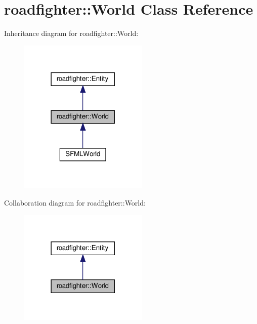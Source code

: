 \hypertarget{classroadfighter_1_1World}{}\section{roadfighter\+:\+:World Class Reference}
\label{classroadfighter_1_1World}


Inheritance diagram for roadfighter\+:\+:World\+:\nopagebreak
\begin{figure}[H]
\begin{center}
\leavevmode
\includegraphics[width=174pt]{classroadfighter_1_1World__inherit__graph}
\end{center}
\end{figure}


Collaboration diagram for roadfighter\+:\+:World\+:\nopagebreak
\begin{figure}[H]
\begin{center}
\leavevmode
\includegraphics[width=174pt]{classroadfighter_1_1World__coll__graph}
\end{center}
\end{figure}
